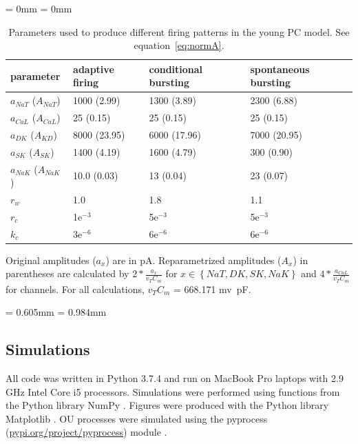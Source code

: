 \documentclass[12pt]{article}
\newcommand{\midsepremove}{\aboverulesep = 0mm \belowrulesep = 0mm}
\newcommand{\midsepdefault}{\aboverulesep = 0.605mm \belowrulesep = 0.984mm}
\begin{document}
\begin{table}[h!]
\centering
 \caption{Parameters used to produce different firing patterns in the young PC model. See equation~\eqref{eq:normA}.} 
\begin{footnotesize}
\midsepremove
\begin{tabular}{p{9em} p{9em}  p{9em}  p{9em}} %
\toprule
\textbf{parameter} & \textbf{adaptive \newline firing} & \textbf{conditional \newline bursting} & \textbf{spontaneous bursting} \\
\toprule
$a_{NaT}$ ($A_{NaT}$) & 1000 (2.99) & 1300 (3.89) & 2300 (6.88) \\
$a_{CaL}$ ($A_{CaL}$)& 25 (0.15) & 25 (0.15) & 25 (0.15) \\
$a_{DK}$ ($A_{KD}$)& 8000 (23.95) & 6000 (17.96) & 7000 (20.95) \\
$a_{SK}$ ($A_{SK}$)& 1400 (4.19) & 1600 (4.79) & 300 (0.90) \\
$a_{NaK}$ ($A_{NaK}$)& 10.0 (0.03) & 13 (0.04) & 23 (0.07) \\
$r_{w}$ & 1.0 & 1.8 & 1.1 \\
$r_{c}$ & 1e$^{-3}$ & 5e$^{-3}$ & 5e$^{-3}$ \\
$k_{c}$ & 3e$^{-6}$ & 6e$^{-6}$ & 6e$^{-6}$ \\
\bottomrule 
\end{tabular}
\vspace{0.2cm}
\begin{flushleft}
\footnotesize{Original amplitudes ($a_x$) are in pA. Reparametrized amplitudes ($A_x$) in parentheses are calculated by $2*\frac{a_x}{v_T C_m}$ for $x \in \left\{NaT,DK,SK,NaK\right\}$ and $4*\frac{a_{CaL}}{v_T C_m}$ for {\Ca} channels. For all calculations, $v_T C_m$ = 668.171 mv~pF.}
\end{flushleft}
\label{tab:regimes}
\end{footnotesize}
\end{table}
\midsepdefault

\subsection{Simulations}
All code was written in Python 3.7.4 and run on MacBook Pro laptops with 2.9 GHz Intel Core i5 processors. Simulations were performed using functions from the Python library NumPy \cite{numpyHarris2020}. Figures were produced with the Python library Matplotlib \cite{hunter2007matplotlib}. OU processes were simulated using the pyprocess (\href{https://pypi.org/project/pyprocess/}{pypi.org/project/pyprocess}) module \citep{mondaca200PyProcess}.
\end{document}

